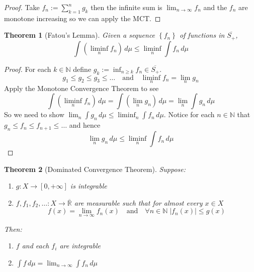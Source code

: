 \documentclass[11pt]{article}
\newcommand{\defeq}{:=}
\newcommand{\abs}[1]{|#1|}
\newcommand{\dm}{\ensuremath{\,d\mu}}
\newcommand{\R}{\mathbb{R}}
\newcommand{\Rb}{\overline{\R}}
\newcommand{\N}{\mathbb{N}}
\newtheorem{theorem}{Theorem}[section]
\begin{document}
\begin{proof}
Take $f_n\defeq\sum_{k=1}^{n}g_k$ then the infinite sum is $\lim_{n\to\infty}f_n$ and the $f_n$ are monotone increasing so we can apply the MCT.
\end{proof}
\begin{theorem}[Fatou's Lemma]
Given a sequence $\left\{f_n\right\}$ of functions in $\overline{S_+}$,
\[
	\int \left(\liminf_n f_n\right)\dm \leq \liminf_n \int f_n \dm
\]
\end{theorem}
\begin{proof}
For each $k\in\N$ define $g_k\defeq\inf_{n\geq k} f_n \in \overline{S_+}$.
\[
	g_1 \leq g_2 \leq g_3 \leq \dots \quad \text{and} \quad \liminf_n f_n = \lim_n g_n
\]
Apply the Monotone Convergence Theorem to see
\[
	\int \left(\liminf_n f_n \right)\dm = \int \left(\lim_n g_n\right)\dm = \lim_n \int g_n \dm
\]
So we need to show $\lim_n\int g_n \dm \leq \liminf_n \int f_n \dm$.
Notice for each $n\in\N$ that $g_n\leq f_n \leq f_{n+1} \leq \dots$ and hence
\[
\lim_n g_n \dm \leq \liminf_n \int f_n \dm
\]
\end{proof}
\begin{theorem}[Dominated Convergence Theorem]
Suppose:
\begin{enumerate}[label=(\roman*)]
	\item $g:X\to [0, +\infty]$ is integrable
	\item $f,f_1,f_2, \dots:X\to\Rb$ are measurable such that for almost every $x\in X$
		\[
			f(x) = \lim_{n\to\infty}f_n(x)\quad\text{and}\quad\forall n\in\N \;\abs{f_n(x)}\leq g(x)
		\]
\end{enumerate}
Then:
\begin{enumerate}
	\item $f$ and each $f_i$ are integrable
	\item $\int f \dm = \lim_{n\to\infty}\int f_n \dm$
\end{enumerate}
\end{theorem}
\end{document}
